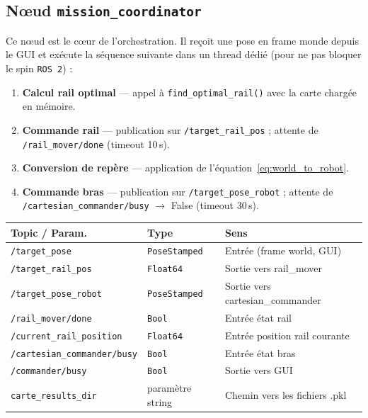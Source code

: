 \documentclass[11pt, a4paper]{article}
\newcommand{\ros}{\texttt{ROS\,2}}
\newcommand{\topic}[1]{\texttt{\color{AccentOrange}#1}}
\begin{document}
\subsection{Nœud \texttt{mission\_coordinator}}

Ce nœud est le cœur de l'orchestration. Il reçoit une pose en frame monde depuis le GUI et exécute la séquence suivante dans un thread dédié (pour ne pas bloquer le spin \ros) :

\begin{enumerate}[leftmargin=2em, itemsep=4pt]
  \item \textbf{Calcul rail optimal} — appel à \texttt{find\_optimal\_rail()} avec la carte chargée en mémoire.
  \item \textbf{Commande rail} — publication sur \topic{/target\_rail\_pos} ; attente de \topic{/rail\_mover/done} (timeout 10\,s).
  \item \textbf{Conversion de repère} — application de l'équation~\eqref{eq:world_to_robot}.
  \item \textbf{Commande bras} — publication sur \topic{/target\_pose\_robot} ; attente de \topic{/cartesian\_commander/busy} $\to$ False (timeout 30\,s).
\end{enumerate}

\begin{center}
\begin{tabular}{lll}
  \toprule
  \rowcolor{LightPurple}
  \textbf{Topic / Param.} & \textbf{Type} & \textbf{Sens} \\
  \midrule
  \topic{/target\_pose}           & \texttt{PoseStamped} & Entrée (frame world, GUI) \\
  \topic{/target\_rail\_pos}      & \texttt{Float64}     & Sortie vers rail\_mover \\
  \topic{/target\_pose\_robot}    & \texttt{PoseStamped} & Sortie vers cartesian\_commander \\
  \topic{/rail\_mover/done}       & \texttt{Bool}        & Entrée état rail \\
  \topic{/current\_rail\_position}& \texttt{Float64}     & Entrée position rail courante \\
  \topic{/cartesian\_commander/busy} & \texttt{Bool}     & Entrée état bras \\
  \topic{/commander/busy}         & \texttt{Bool}        & Sortie vers GUI \\
  \texttt{carte\_results\_dir}    & paramètre string     & Chemin vers les fichiers .pkl \\
  \bottomrule
\end{tabular}
\end{center}
\end{document}
